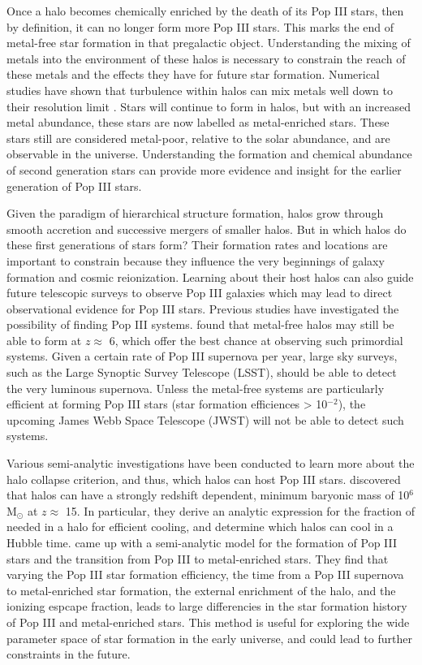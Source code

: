 \documentclass[a4paper,fleqn,usenatbib]{mnras}
\begin{document}
Once a halo becomes chemically enriched by the death of its Pop III stars, then by definition, it can no longer form more Pop III stars. This marks the end of metal-free star formation in that pregalactic object. Understanding the mixing of metals into the environment of these halos is necessary to constrain the reach of these metals and the effects they have for future star formation. Numerical studies have shown that turbulence within halos can mix metals well down to their resolution limit \citep[][and more]{Wise08_Gal, Greif10}. Stars will continue to form in halos, but with an increased metal abundance, these stars are now labelled as metal-enriched stars. These stars still are considered metal-poor, relative to the solar abundance, and are observable in the universe. Understanding the formation and chemical abundance of second generation stars can provide more evidence and insight for the earlier generation of Pop III stars.

Given the paradigm of hierarchical structure formation, halos grow through smooth accretion and successive mergers of smaller halos. But in which halos do these first generations of stars form? Their formation rates and locations are important to constrain because they influence the very beginnings of galaxy formation and cosmic reionization. Learning about their host halos can also guide future telescopic surveys to observe Pop III galaxies which may lead to direct observational evidence for Pop III stars. Previous studies have investigated the possibility of finding Pop III systems. \citet{Trenti09} found that metal-free halos may still be able to form at $z \approx$ 6, which offer the best chance at observing such primordial systems. Given a certain rate of Pop III supernova per year, large sky surveys, such as the Large Synoptic Survey Telescope (LSST), should be able to detect the very luminous supernova. Unless the metal-free systems are particularly efficient at forming Pop III stars (star formation efficiences > 10$^{-2}$), the upcoming James Webb Space Telescope (JWST) will not be able to detect such systems.

Various semi-analytic investigations have been conducted to learn more about the halo collapse criterion, and thus, which halos can host Pop III stars. \citet{Tegmark97} discovered that halos can have a strongly redshift dependent, minimum baryonic mass of 10$^{6}$ M$_{\odot}$ at $z \approx$ 15. In particular, they derive an analytic expression for the fraction of \hh{} needed in a halo for efficient cooling, and determine which  halos can cool in a Hubble time. \citet{Visbal18} came up with a semi-analytic model for the formation of Pop III stars and the transition from Pop III to metal-enriched stars. They find that varying the Pop III star formation efficiency, the time from a Pop III supernova to metal-enriched star formation, the external enrichment of the halo, and the ionizing espcape fraction, leads to large differencies in the star formation history of Pop III and metal-enriched stars. This method is useful for exploring the wide parameter space of star formation in the early universe, and could lead to further constraints in the future. 
\end{document}
